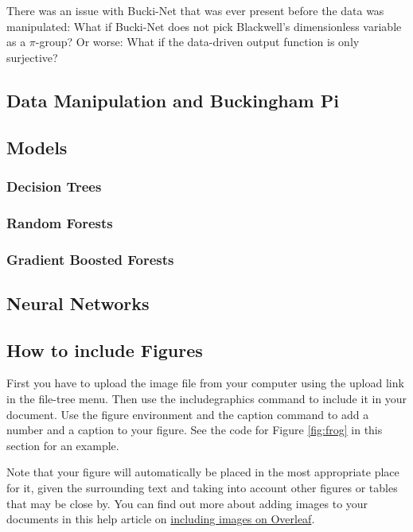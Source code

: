 \documentclass{article}
\begin{document}
There was an issue with Bucki-Net that was ever present before the data was manipulated: What if Bucki-Net does not pick Blackwell's dimensionless variable as a $\pi$-group? Or worse: What if the data-driven output function is only surjective? 

\subsection{Data Manipulation and Buckingham Pi}

\subsection{Models}

\subsubsection{Decision Trees}

\subsubsection{Random Forests}

\subsubsection{Gradient Boosted Forests}

\subsection{Neural Networks}

\subsection{How to include Figures}

First you have to upload the image file from your computer using the upload link in the file-tree menu. Then use the includegraphics command to include it in your document. Use the figure environment and the caption command to add a number and a caption to your figure. See the code for Figure \ref{fig:frog} in this section for an example.

Note that your figure will automatically be placed in the most appropriate place for it, given the surrounding text and taking into account other figures or tables that may be close by. You can find out more about adding images to your documents in this help article on \href{https://www.overleaf.com/learn/how-to/Including_images_on_Overleaf}{including images on Overleaf}.
\end{document}
